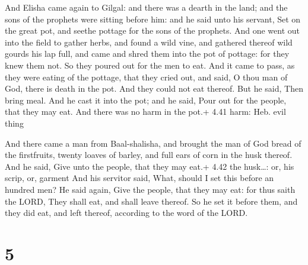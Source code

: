  And Elisha came again to Gilgal: and there was a dearth
in the land; and the sons of the prophets were sitting before him: and
he said unto his servant, Set on the great pot, and seethe pottage for
the sons of the prophets.  And one went out into the field
to gather herbs, and found a wild vine, and gathered thereof wild gourds
his lap full, and came and shred them into the pot of pottage: for they
knew them not.  So they poured out for the men to eat. And
it came to pass, as they were eating of the pottage, that they cried
out, and said, O thou man of God, there is death in the pot. And they
could not eat thereof.  But he said, Then bring meal. And
he cast it into the pot; and he said, Pour out for the people, that they
may eat. And there was no harm in the pot.+ 4.41 harm: Heb. evil thing

 And there came a man from Baal-shalisha, and brought the
man of God bread of the firstfruits, twenty loaves of barley, and full
ears of corn in the husk thereof. And he said, Give unto the people,
that they may eat.+ 4.42 the husk\ldots: or, his scrip, or, garment
 And his servitor said, What, should I set this before an
hundred men? He said again, Give the people, that they may eat: for thus
saith the LORD, They shall eat, and shall leave thereof. 
So he set it before them, and they did eat, and left thereof, according
to the word of the LORD.

\hypertarget{section-4}{%
\section{5}\label{section-4}}

